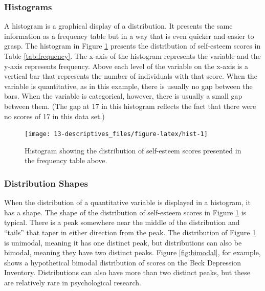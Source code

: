 \documentclass[
]{krantz}
\begin{document}
\hypertarget{histograms}{%
\subsubsection*{Histograms}\label{histograms}}


A histogram is a graphical display of a distribution. It presents the same information as a frequency table but in a way that is even quicker and easier to grasp. The histogram in Figure \ref{fig:hist} presents the distribution of self-esteem scores in Table \ref{tab:frequency}. The x-axis of the histogram represents the variable and the y-axis represents frequency. Above each level of the variable on the x-axis is a vertical bar that represents the number of individuals with that score. When the variable is quantitative, as in this example, there is usually no gap between the bars. When the variable is categorical, however, there is usually a small gap between them. (The gap at 17 in this histogram reflects the fact that there were no scores of 17 in this data set.)

\begin{figure}

{\centering \texttt{[image: 13-descriptives\_files/figure-latex/hist-1]} 

}

\caption{Histogram showing the distribution of self-esteem scores presented in the frequency table above.}\label{fig:hist}
\end{figure}

\hypertarget{distribution-shapes}{%
\subsubsection*{Distribution Shapes}\label{distribution-shapes}}


When the distribution of a quantitative variable is displayed in a histogram, it has a shape. The shape of the distribution of self-esteem scores in Figure \ref{fig:hist} is typical. There is a peak somewhere near the middle of the distribution and ``tails'' that taper in either direction from the peak. The distribution of Figure \ref{fig:hist} is unimodal, meaning it has one distinct peak, but distributions can also be bimodal, meaning they have two distinct peaks. Figure \ref{fig:bimodal}, for example, shows a hypothetical bimodal distribution of scores on the Beck Depression Inventory. Distributions can also have more than two distinct peaks, but these are relatively rare in psychological research.
\end{document}
